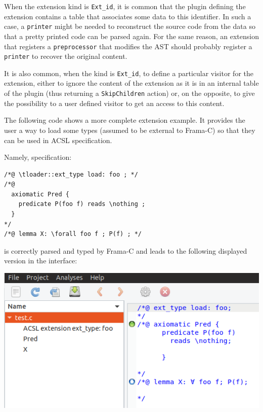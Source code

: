 When the extension kind is \verb|Ext_id|, it is common that the plugin
defining the extension contains a table that associates some data to this
identifier. In such a case, a \verb|printer| might be needed to reconstruct
the source code from the data so that a pretty printed code can be parsed
again. For the same reason, an extension that registers a \verb|preprocessor|
that modifies the AST should probably register a \verb|printer| to recover
the original content.

It is also common, when the kind is \verb|Ext_id|, to define a particular
visitor for the extension, either to ignore the content of the extension as
it is in an internal table of the plugin (thus returning a \verb|SkipChildren|
action) or, on the opposite, to give the possibility to a user defined visitor
to get an access to this content.

The following code shows a more complete extension example. It provides the
user a way to load some types (assumed to be external to Frama-C) so that they
can be used in ACSL specification.


Namely, specification:

\begin{lstlisting}[style=c]
/*@ \tloader::ext_type load: foo ; */
/*@
  axiomatic Pred {
    predicate P(foo f) reads \nothing ;
  }
*/
/*@ lemma X: \forall foo f ; P(f) ; */
\end{lstlisting}

is correctly parsed and typed by Frama-C and leads to the following displayed
version in the interface:

\includegraphics[width=\textwidth]{examples/acsl_extension_ext_types/acsl_extension_ext_types}



